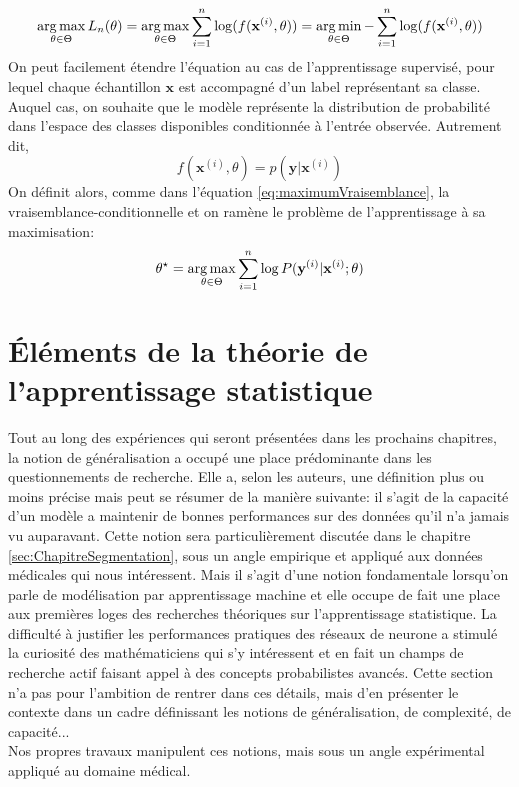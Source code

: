\begin{equation}
	 \operatorname*{arg\,max}_{\theta \in \Theta} L_n(\theta) = \operatorname*{arg\,max}_{\theta \in \Theta} \sum_{i=1}^{n}\log(f(\mathbf{x}^{(i)}, \theta)) = \operatorname*{arg\,min}_{\theta \in \Theta} - \sum_{i=1}^{n}\log(f(\mathbf{x}^{(i)}, \theta))
\end{equation}
On peut facilement étendre l'équation au cas de l'apprentissage supervisé, pour lequel chaque échantillon $\mathbf{x}$ est accompagné d'un label représentant sa classe. Auquel cas, on souhaite que le modèle représente la distribution de probabilité dans l'espace des classes disponibles conditionnée à l'entrée observée. Autrement dit,
\begin{equation}
	f(\mathbf{x}^{(i)}, \theta) = p(\mathbf{y} | \mathbf{x}^{(i)})
\end{equation}
On définit alors, comme dans l'équation \ref{eq:maximumVraisemblance}, la vraisemblance-conditionnelle et on ramène le problème de l'apprentissage à sa maximisation:
\begin{equation}
	\theta^\star= \operatorname*{arg\,max}_{\theta \in \Theta} \sum_{i=1}^{n} \log P(\mathbf{y}^{(i)}|\mathbf{x}^{(i)}; \theta)
\end{equation}

\section{Éléments de la théorie de l'apprentissage statistique}
\label{sec:theorieApprentissage}
Tout au long des expériences qui seront présentées dans les prochains chapitres, la notion de généralisation a occupé une place prédominante dans les questionnements de recherche. Elle a, selon les auteurs, une définition plus ou moins précise mais peut se résumer de la manière suivante: il s'agit de la capacité d'un modèle a maintenir de bonnes performances sur des données qu'il n'a jamais vu auparavant. Cette notion sera particulièrement discutée dans le chapitre \ref{sec:ChapitreSegmentation}, sous un angle empirique et appliqué aux données médicales qui nous intéressent. Mais il s'agit d'une notion fondamentale lorsqu'on parle de modélisation par apprentissage machine et elle occupe de fait une place aux premières loges des recherches théoriques sur l'apprentissage statistique. La difficulté à justifier les performances pratiques des réseaux de neurone a stimulé la curiosité des mathématiciens qui s'y intéressent et en fait un champs de recherche actif faisant appel à des concepts probabilistes avancés. Cette section n'a pas pour l'ambition de rentrer dans ces détails, mais d'en présenter le contexte dans un cadre définissant les notions de généralisation, de complexité, de capacité... \\
Nos propres travaux manipulent ces notions, mais sous un angle expérimental appliqué au domaine médical.
